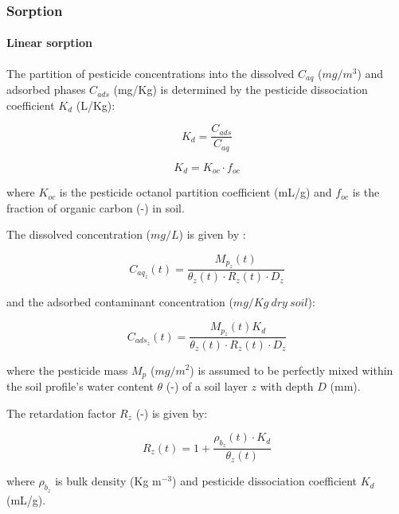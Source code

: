 \documentclass[]{article}
\let\oldparagraph\paragraph
\renewcommand{\paragraph}[1]{\oldparagraph{#1}\mbox{}}
\begin{document}
\subsubsection{Sorption}\label{sorption}

\paragraph{Linear sorption}\label{linear-sorption}

The partition of pesticide concentrations into the dissolved \(C_{aq}\)
(\(mg/m^3\)) and adsorbed phases \(C_{ads}\) (mg/Kg) is determined by
the pesticide dissociation coefficient \(K_d\) (L/Kg):

\begin{equation}
K_d = \frac{ C_{ads} }{ C_{aq}  }
\label{eq:kd}
\end{equation}

\begin{equation}
K_d = K_{oc} \cdot f_{oc}
\label{eq:kd}
\end{equation}

where \(K_{oc}\) is the pesticide octanol partition coefficient (mL/g)
and \(f_{oc}\) is the fraction of organic carbon (-) in soil.

The dissolved concentration (\(mg/L\)) is given by \citep{Whelan1987}:

\begin{equation}
C_{aq_z}(t) = \frac{ M_{p_z}(t) }{\theta_z(t) \cdot R_z{(t)} \cdot D_{z} }
\label{eq:conc_aq}
\end{equation}

and the adsorbed contaminant concentration (\(mg/Kg~dry~soil\)):

\begin{equation}
C_{ads_z}(t) = \frac{ M_{p_z}(t) K_d}{\theta_z(t) \cdot R_z{(t)} \cdot D_{z} }
\label{eq:conc_ads}
\end{equation}

where the pesticide mass \(M_p\) (\(mg/m^2\)) is assumed to be perfectly
mixed within the soil profile's water content \(\theta\) (-) of a soil
layer \(z\) with depth \(D\) (mm).

The retardation factor \(R_z\) (-) is given by:

\begin{equation}
R_z(t) = 1 + \frac{ \rho_{b_z}(t) \cdot K_d }{ \theta_z(t) }
\label{eq:retard_linear}
\end{equation}

where \(\rho_{b_z}\) is bulk density (Kg m\(^{-3}\)) and pesticide
dissociation coefficient \(K_d\) (mL/g).
\end{document}
